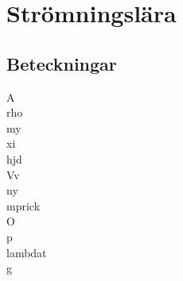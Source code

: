 \chapter{Strömningslära}
\section*{Beteckningar}
\acrfull{A} \\
\acrfull{rho} \\
\acrfull{my} \\
\acrfull{xi} \\
\acrfull{hjd} \\
\acrfull{Vv} \\
\acrfull{ny} \\
\acrfull{mprick} \\
\acrfull{O} \\
\acrfull{p} \\
\acrfull{lambdat} \\
\acrfull{g}

